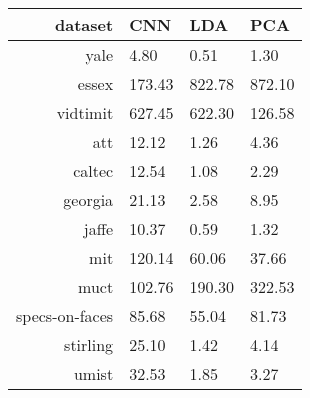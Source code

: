 \begin{tabular}{|r|l|l|l|}
  \hline
  \rowcolor{Gray}
  dataset & CNN & LDA & PCA \\
  \hline
  yale & 4.80 & 0.51 & 1.30 \\
  \hline
  essex & 173.43 & 822.78 & 872.10 \\
  \hline
  vidtimit & 627.45 & 622.30 & 126.58 \\
  \hline
  att & 12.12 & 1.26 & 4.36 \\
  \hline
  caltec & 12.54 & 1.08 & 2.29 \\
  \hline
  georgia & 21.13 & 2.58 & 8.95 \\
  \hline
  jaffe & 10.37 & 0.59 & 1.32 \\
  \hline
  mit & 120.14 & 60.06 & 37.66 \\
  \hline
  muct & 102.76 & 190.30 & 322.53 \\
  \hline
  specs-on-faces & 85.68 & 55.04 & 81.73 \\
  \hline
  stirling & 25.10 & 1.42 & 4.14 \\
  \hline
  umist & 32.53 & 1.85 & 3.27 \\
  \hline
\end{tabular}
